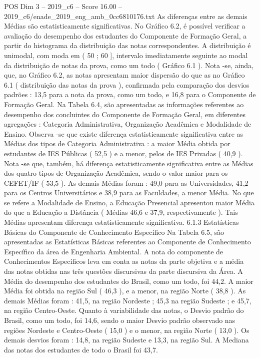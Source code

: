 \begin{textsample}{POS Dim 3 – 2019\_c6 – Score 16.00 – 2019\_c6/enade\_2019\_eng\_amb\_0cc6810176.txt}
As diferenças entre as demais Médias são estatisticamente significativas.
No Gráfico 6.2, é possível verificar a avaliação do desempenho dos estudantes do Componente de Formação Geral, a partir do histograma da distribuição das notas correspondentes.
A distribuição é unimodal, com moda em ( 50 ; 60 ], intervalo imediatamente seguinte ao modal da distribuição de notas da prova, como um todo ( Gráfico 6.1 ).
Nota -se, ainda, que, no Gráfico 6.2, as notas apresentam maior dispersão do que as no Gráfico 6.1 ( distribuição das notas da prova ), confirmada pela comparação dos desvios padrões : 13,5 para a nota da prova, como um todo, e 16,8 para o Componente de Formação Geral.
Na Tabela 6.4, são apresentadas as informações referentes ao desempenho dos concluintes do Componente de Formação Geral, em diferentes agregações : Categoria Administrativa, Organização Acadêmica e Modalidade de Ensino.
Observa -se que existe diferença estatisticamente significativa entre as Médias dos tipos de Categoria Administrativa : a maior Média obtida por estudantes de IES Públicas ( 52,5 ) e a menor, pelos de IES Privadas ( 40,9 ).
Nota -se que, também, há diferença estatisticamente significativa entre as Médias dos quatro tipos de Organização Acadêmica, sendo o valor maior para os CEFET/IF ( 53,5 ).
As demais Médias foram : 49,0 para as Universidades, 41,2 para os Centros Universitários e 38,9 para as Faculdades, a menor Média.
No que se refere a Modalidade de Ensino, a Educação Presencial apresentou maior Média do que a Educação a Distância ( Médias 46,6 e 37,9, respectivamente ).
Tais Médias apresentam diferença estatisticamente significativa. 6.1.3 Estatísticas Básicas do Componente de Conhecimento Específico Na Tabela 6.5, são apresentadas as Estatísticas Básicas referentes ao Componente de Conhecimento Específico da área de Engenharia Ambiental.
A nota do componente de Conhecimentos Específicos leva em conta as notas da parte objetiva e a média das notas obtidas nas três questões discursivas da parte discursiva da Área.
A Média do desempenho dos estudantes do Brasil, como um todo, foi 44,2.
A maior Média foi obtida na região Sul ( 46,3 ), e a menor, na região Norte ( 38,8 ).
As demais Médias foram : 41,5, na região Nordeste ; 45,3 na região Sudeste ; e 45,7, na região Centro-Oeste.
Quanto à variabilidade das notas, o Desvio padrão do Brasil, como um todo, foi 14,6, sendo o maior Desvio padrão observado nas regiões Nordeste e Centro-Oeste ( 15,0 ) e o menor, na região Norte ( 13,0 ).
Os demais desvios foram : 14,8, na região Sudeste e 13,3, na região Sul.
A Mediana das notas dos estudantes de todo o Brasil foi 43,7.

\end{textsample}
